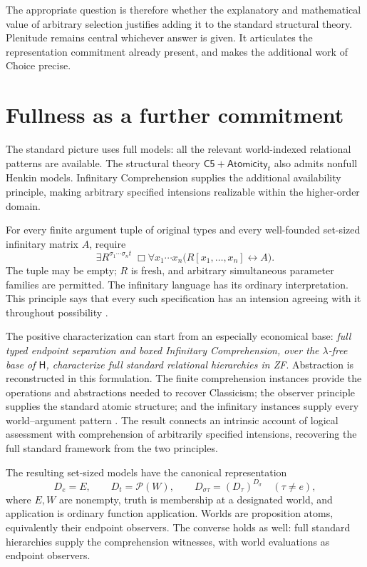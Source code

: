 \documentclass[12pt,letterpaper]{article}
\newcommand{\Hlogic}{\mathsf H}
\newcommand{\Cfive}{\mathsf{C5}}
\newcommand{\At}{\mathsf{Atomicity}}
\begin{document}
The appropriate question is therefore whether the explanatory and mathematical value of arbitrary selection justifies adding it to the standard structural theory. Plenitude remains central whichever answer is given. It articulates the representation commitment already present, and makes the additional work of Choice precise.

\section{Fullness as a further commitment}\label{sec:comprehension}

The standard picture uses full models: all the relevant world-indexed relational patterns are available. The structural theory $\Cfive+\At_t$ also admits nonfull Henkin models. Infinitary Comprehension supplies the additional availability principle, making arbitrary specified intensions realizable within the higher-order domain.

For every finite argument tuple of original types and every well-founded set-sized infinitary matrix $A$, require
\begin{equation}\label{eq:infcomp}
 \exists R^{\sigma_1\cdots\sigma_n t}\;
 \Box\forall x_1\cdots x_n
       \bigl(R[x_1,\ldots,x_n]\leftrightarrow A\bigr).
\end{equation}
The tuple may be empty; $R$ is fresh, and arbitrary simultaneous parameter families are permitted. The infinitary language has its ordinary interpretation. This principle says that every such specification has an intension agreeing with it throughout possibility \citep[\S\S1, 4]{infcomp}.

The positive characterization can start from an especially economical base: \emph{full typed endpoint separation and boxed Infinitary Comprehension, over the $\lambda$-free base of $\Hlogic$, characterize full standard relational hierarchies in ZF}. Abstraction is reconstructed in this formulation. The finite comprehension instances provide the operations and abstractions needed to recover Classicism; the observer principle supplies the standard atomic structure; and the infinitary instances supply every world--argument pattern \citep{lambdahandoff}. The result connects an intrinsic account of logical assessment with comprehension of arbitrarily specified intensions, recovering the full standard framework from the two principles.

The resulting set-sized models have the canonical representation
\[
 D_e=E,\qquad D_t=\mathcal P(W),\qquad
 D_{\sigma\tau}=(D_\tau)^{D_\sigma}\quad(\tau\ne e),
\]
where $E,W$ are nonempty, truth is membership at a designated world, and application is ordinary function application. Worlds are proposition atoms, equivalently their endpoint observers. The converse holds as well: full standard hierarchies supply the comprehension witnesses, with world evaluations as endpoint observers.
\end{document}
